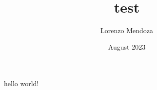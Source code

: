 \documentclass{article}
\title{test}
\author{Lorenzo Mendoza}
\date{August 2023}
\begin{document}
\maketitle

\section{}
hello world!
\end{document}
